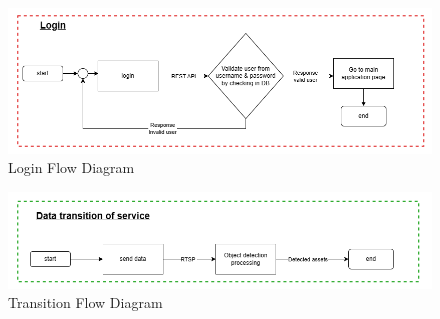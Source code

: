 \begin{figure}[ht]
  \begin{center}
  \includegraphics[scale=0.6]{resources/LoginFlow.png}
  \end{center}
  \caption[Login Flow Diagram]{Login Flow Diagram}
  \label{fig:login flow design}
\end{figure}

\begin{figure}[ht]
  \begin{center}
  \includegraphics[scale=0.6]{resources/TransitionFlow.png}
  \end{center}
  \caption[Transition Flow Diagram]{Transition Flow Diagram}
  \label{fig:transition flow design}
\end{figure}
